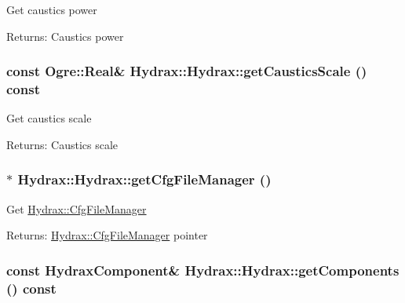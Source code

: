 Get caustics power \begin{Desc}
\item[Returns:]Caustics power \end{Desc}
\hypertarget{class_hydrax_1_1_hydrax_4e9359d0ee14a3f1aae1776b7144bfab}{
\subsubsection[{getCausticsScale}]{\setlength{\rightskip}{0pt plus 5cm}const Ogre::Real\& Hydrax::Hydrax::getCausticsScale () const}}
\label{class_hydrax_1_1_hydrax_4e9359d0ee14a3f1aae1776b7144bfab}


Get caustics scale \begin{Desc}
\item[Returns:]Caustics scale \end{Desc}
\hypertarget{class_hydrax_1_1_hydrax_5ac35cd3073a581415afb95bef7e7180}{
\subsubsection[{getCfgFileManager}]{$\ast$ Hydrax::Hydrax::getCfgFileManager ()}}
\label{class_hydrax_1_1_hydrax_5ac35cd3073a581415afb95bef7e7180}


Get \hyperlink{class_hydrax_1_1_cfg_file_manager}{Hydrax::CfgFileManager} \begin{Desc}
\item[Returns:]\hyperlink{class_hydrax_1_1_cfg_file_manager}{Hydrax::CfgFileManager} pointer \end{Desc}
\hypertarget{class_hydrax_1_1_hydrax_af3b15b5c19cd07a6a95c40ee9b3247d}{
\subsubsection[{getComponents}]{\setlength{\rightskip}{0pt plus 5cm}const {\bf HydraxComponent}\& Hydrax::Hydrax::getComponents () const}}
\label{class_hydrax_1_1_hydrax_af3b15b5c19cd07a6a95c40ee9b3247d}


